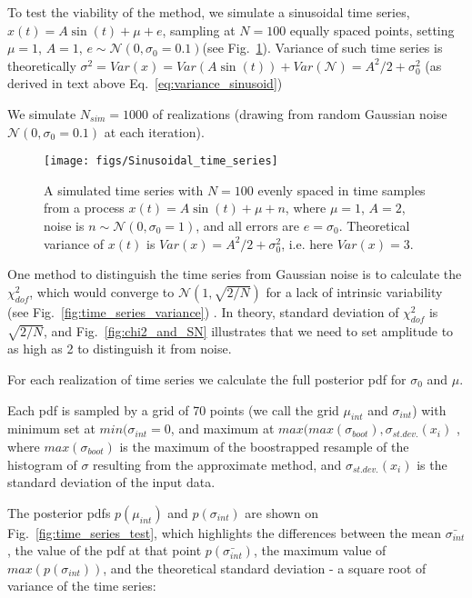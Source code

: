 \documentclass[fleqn,usenatbib]{mnras}  %
\begin{document}
To test the viability of the method, we simulate a sinusoidal time series, $x(t) = A \sin{(t)}+\mu+e$, sampling at $N=100$ equally spaced points, setting $\mu=1$, $A=1$, $e \sim \mathcal{N}(0,\sigma_{0}=0.1)$(see Fig.~\ref{fig:sinusoidal_time_series}).  Variance of such time series is theoretically $\sigma^{2} = Var(x) = Var(A\sin{(t)})+Var(\mathcal{N}) = A^{2}/2 + \sigma_{0}^{2} $ (as derived in text above Eq.~\ref{eq:variance_sinusoid})

We simulate $N_{sim}= 1000$  of realizations (drawing from random Gaussian noise $\mathcal{N}(0,\sigma_{0}=0.1)$ at each iteration). 

\begin{figure}
 \texttt{[image: figs/Sinusoidal\_time\_series]}
 \caption{A simulated time series with $N=100$ evenly spaced in time samples from a process $x(t) = A \sin{(t)} +\mu+n$, where  $\mu=1$, $A=2$, noise is $n \sim \mathcal{N}(0,\sigma_{0}=1)$, and all errors are $e = \sigma_{0}$. Theoretical variance of $x(t)$ is  $Var(x) = A^{2}/2 + \sigma_{0}^{2}$, i.e. here $Var(x) = 3$. }
 \label{fig:sinusoidal_time_series}
\end{figure}

One method to distinguish the time series from Gaussian noise is to calculate the $\chi^{2}_{dof} $, which would converge to $\mathcal{N}(1,\sqrt{2/N})$ for a lack of intrinsic variability (see Fig.~\ref{fig:time_series_variance}) . In theory, standard deviation of $\chi^{2}_{dof} $ is $\sqrt{2/N}$,   and Fig.~\ref{fig:chi2_and_SN} illustrates that  we need to set amplitude to as high as 2 to distinguish it from noise.  

For each realization of time series we calculate the full posterior pdf for $\sigma_{0}$ and $\mu$. 

Each pdf is sampled by a grid of 70 points (we call the grid $\mu_{int}$ and $\sigma_{int}$) with minimum set at $min(\sigma_{int} = 0$, and maximum at $ max( max(\sigma_{boot}), \sigma_{st.dev.}(x_{i}) $ , where $max(\sigma_{boot})$ is the maximum of the boostrapped resample of the histogram of $\sigma$ resulting from the approximate method, and $\sigma_{st.dev.}(x_{i})$ is the standard deviation of the input data. 


The posterior pdfs $p(\mu_{int})$ and $p(\sigma_{int})$ are shown on Fig.~\ref{fig:time_series_test}, which highlights the differences between the  mean $\bar{\sigma_{int}}$, the value of the pdf at that point $p(\bar{\sigma_{int}})$, the maximum value of $max(p(\sigma_{int}))$, and the theoretical standard deviation  - a square root of variance of the time series:
\end{document}
